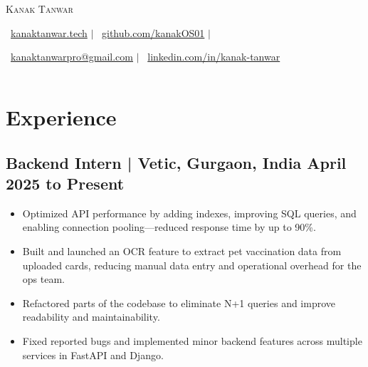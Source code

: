 \documentclass[a4paper,11pt]{article}
\begin{document}
\pagestyle{empty} %

\vspace{-10mm}
\begin{center}
    {\Huge\scshape Kanak Tanwar}
    
    \vspace{0.01em}
    \faGlobe\ \href{https://kanaktanwar.tech}{kanaktanwar.tech} $\vert$
    \faGithub\ \href{https://github.com/kanakOS01}{github.com/kanakOS01} $\vert$
    
    \faEnvelope\ \href{mailto:kanaktanwarpro@gmail.com}{kanaktanwarpro@gmail.com} $\vert$
    \faLinkedin\ \href{https://www.linkedin.com/in/kanak-tanwar/}{linkedin.com/in/kanak-tanwar}
\end{center} 
\vspace{-7mm}

    \small\begin{tabularx}{\textwidth}{|c|Y|c|c|}
    \end{tabularx}

\section*{Experience}
\vspace{-2mm}

\subsection{Backend Intern | Vetic, Gurgaon, India
\hfill April 2025 to Present}
\begin{itemize}[itemsep=0pt,parsep=0pt,topsep=0pt,partopsep=0pt]
    \item Optimized API performance by adding indexes, improving SQL queries, and enabling connection pooling—reduced response time by up to 90\%.
    \item Built and launched an OCR feature to extract pet vaccination data from uploaded cards, reducing manual data entry and operational overhead for the ops team.
    \item Refactored parts of the codebase to eliminate N+1 queries and improve readability and maintainability.
    \item Fixed reported bugs and implemented minor backend features across multiple services in FastAPI and Django.
\end{itemize}
\vspace{-3mm}
\end{document}

